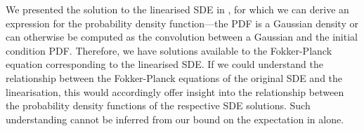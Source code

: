 We presented the solution to the linearised SDE in , for which we can derive an expression for the probability density function---the PDF is a Gaussian density or can otherwise be computed as the convolution between a Gaussian and the initial condition PDF.
Therefore, we have solutions available to the Fokker-Planck equation corresponding to the linearised SDE.
If we could understand the relationship between the Fokker-Planck equations of the original SDE and the linearisation, this would accordingly offer insight into the relationship between the probability density functions of the respective SDE solutions.
Such understanding cannot be inferred from our bound on the expectation in  alone.

